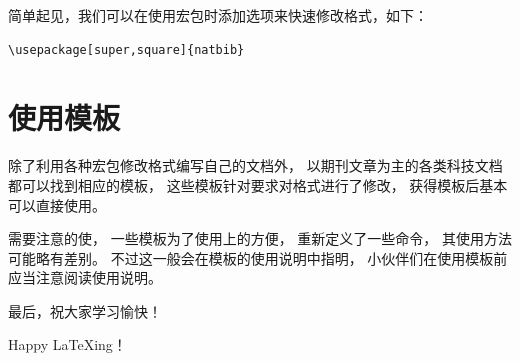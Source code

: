 \documentclass[UTF8]{ctexart}
\numberwithin{equation}{section}			%
\begin{document}
    简单起见，我们可以在使用宏包时添加选项来快速修改格式，如下：
    
\begin{lstlisting}
\usepackage[super,square]{natbib}
\end{lstlisting}
        
    \section{使用模板}
    除了利用各种宏包修改格式编写自己的文档外，
    以期刊文章为主的各类科技文档都可以找到相应的模板，
    这些模板针对要求对格式进行了修改，
    获得模板后基本可以直接使用。
    
    需要注意的使，
    一些模板为了使用上的方便，
    重新定义了一些命令，
    其使用方法可能略有差别。
    不过这一般会在模板的使用说明中指明，
    小伙伴们在使用模板前应当注意阅读使用说明。
    
    最后，祝大家学习愉快！
    
    Happy \LaTeX ing！
    
    
\end{document}
